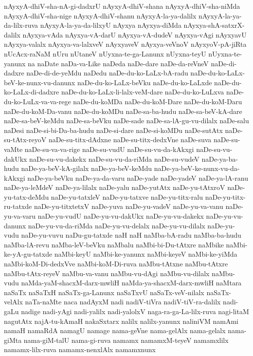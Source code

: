 {nAyxyA-dhiV-sha-nA-gi-dadxrU
nAyxyA-dhiV-shana
nAyxyA-dhiV-sha-niMda
nAyxyA-dhiV-sha-nige
nAyxyA-dhiV-shanu
nAyxyA-la-ya-dalilx
nAyxyA-la-ya-da-lilx-ruva
nAyxyA-la-ya-da-lilxyU
nAyxya
nAyxya-diMda
nAyxya-shA-satxrX-dalilx
nAyxya-vAda
nAyxya-vA-darU
nAyxya-vA-dudeV
nAyxya-vAgi
nAyxyavU
nAyxya-valalx
nAyxya-va-lalxveV
nAyxyaveV
nAyxya-veVnoV
nAyxyoV-pA-jiRta
nUcAcx-raNaM
nUru
nUtaneV
nUyxna-te-ga-Lanunx
nUyxna-teyU
nUyxna-te-yanunx
na
naDate
naDa-va-Like
naDeda
naDe-dare
naDe-da-reVneV
naDe-di-dadxre
naDe-di-de-yeMdu
naDedu
naDe-du-ko-LaLx-bA-radu
naDe-du-ko-LaLx-beV-ke-nunx-vu-danunx
naDe-du-ko-LaLx-beVku
naDe-du-ko-LaLxde
naDe-du-ko-LaLx-di-dadxre
naDe-du-ko-LaLx-li-lalx-veM-dare
naDe-du-ko-LuLxva
naDe-du-ko-LuLx-va-va-rege
naDe-du-koMDa
naDe-du-koM-Dare
naDe-du-koM-Daru
naDe-du-koM-Da-vanu
naDe-du-koMDu
naDe-sa-ba-hudu
naDe-sa-beV-kA-dare
naDe-sa-beV-keMdu
naDe-sa-beVku
naDe-sade
naDe-sa-lA-gu-vu-dilalx
naDe-salu
naDesi
naDe-si-bi-Da-ba-hudu
naDe-si-dare
naDe-si-koMDu
naDe-sutAtx
naDe-su-tAtx-reyoV
naDe-su-titx-dAdxne
naDe-su-titx-dedxVne
naDe-suva
naDe-su-vaMte
naDe-su-va-va-rige
naDe-su-vudU
naDe-su-vu-da-kAkxgi
naDe-su-vu-dakUkx
naDe-su-vu-dakekx
naDe-su-vu-da-riMda
naDe-su-vudeV
naDe-ya-ba-hudu
naDe-ya-beV-kA-gilalx
naDe-ya-beV-keMdu
naDe-ya-beV-ke-nunx-vu-da-kAkxgi
naDe-ya-beVku
naDe-ya-da-varu
naDe-yade
naDe-yadeV
naDe-ya-lA-ranu
naDe-ya-leMdeV
naDe-ya-lilalx
naDe-yalu
naDe-yutAtx
naDe-yu-tAtxroV
naDe-yu-tatx-deMdu
naDe-yu-tatxleV
naDe-yu-tatxve
naDe-yu-titx-ralu
naDe-yu-titx-ru-tatxde
naDe-yu-titxtetxV
naDe-yuva
naDe-yu-vadeV
naDe-yu-va-vanu
naDe-yu-va-varu
naDe-yu-vudU
naDe-yu-vu-dakUkx
naDe-yu-vu-dakekx
naDe-yu-vu-danunx
naDe-yu-vu-da-riMda
naDe-yu-vu-delalx
naDe-yu-vu-dilalx
naDe-yu-vudu
naDe-yu-vuvu
naDu-gu-tatxde
naH
naH‌
naMba-bA-radu
naMba-ba-hudu
naMba-lA-revu
naMba-leV-beVku
naMbalu
naMbi-bi-Du-tAtxre
naMbike
naMbi-ke-yA-gu-tatxde
naMbi-keyU
naMbi-ke-yanunx
naMbi-keyeV
naMbi-ke-yiMda
naMbi-koM-Di-dedxVve
naMbi-koM-Di-ruva
naMbu-tAtxne
naMbu-tAtxre
naMbu-tAtx-reyeV
naMbu-va-vanu
naMbu-vu-dAgi
naMbu-vu-dilalx
naMbu-vudu
naMda-yaM-shacxM-darx-mwliH
naMda-ya-shacxM-darx-mwliH
naMtara
naSaTx
naSaTxH
naSaTx-ga-Lanunx
naSaTxvU
naSaTx-veV-nilalx
naSaTx-velAlx
naTa-naMte
naca
nadAyxM
nadi
nadiV-tiVra
nadiV-tiV-ra-dalilx
nadi-gaLu
nadige
nadi-yAgi
nadi-yalilx
nadi-yalolxV
naga-ra-ga-La-lilx-ruva
nagi-litaM
nagutAtx
najA-tu-kAmaH
nakaSxtarx
nalilx
nalilx-yanunx
naliniVM
namAmi
namaH
namaRdA
namagU
namage
nama-geVne
nama-gelAlx
nama-gelalx
nama-giMta
nama-giM-talU
nama-gi-ruva
namamx
namamxM-teyeV
namamxlilx
namamx-lilx-ruva
namamx-nenxlAlx
namamxnunx
}
